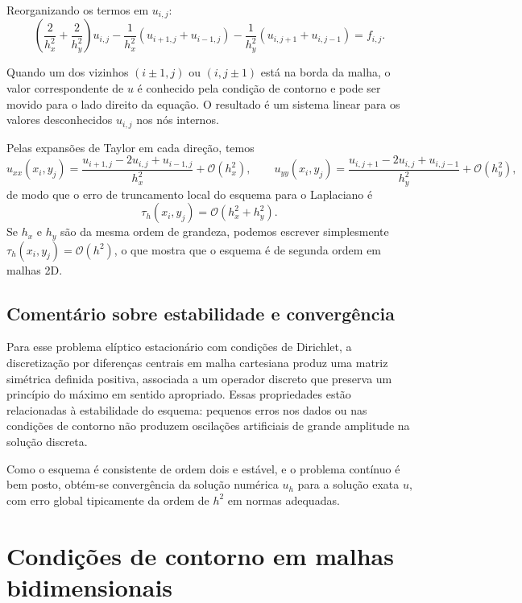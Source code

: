 Reorganizando os termos em $u_{i,j}$:
\begin{equation}
    \left(
      \frac{2}{h_x^2} + \frac{2}{h_y^2}
    \right) u_{i,j}
    - \frac{1}{h_x^2}\left(u_{i+1,j} + u_{i-1,j}\right)
    - \frac{1}{h_y^2}\left(u_{i,j+1} + u_{i,j-1}\right)
    = f_{i,j}.
\end{equation}

Quando um dos vizinhos $(i\pm1,j)$ ou $(i,j\pm1)$ está na borda da malha, 
o valor correspondente de $u$ é conhecido pela condição de contorno e pode 
ser movido para o lado direito da equação. O resultado é um sistema linear 
para os valores desconhecidos $u_{i,j}$ nos nós internos.

Pelas expansões de Taylor em cada direção, temos
\begin{equation}
    u_{xx}(x_i,y_j) 
      = \frac{u_{i+1,j} - 2u_{i,j} + u_{i-1,j}}{h_x^2}
        + \mathcal{O}(h_x^2),
    \qquad
    u_{yy}(x_i,y_j) 
      = \frac{u_{i,j+1} - 2u_{i,j} + u_{i,j-1}}{h_y^2}
        + \mathcal{O}(h_y^2),
\end{equation}
de modo que o erro de truncamento local do esquema para o Laplaciano é
\begin{equation}
    \tau_h(x_i,y_j) = \mathcal{O}(h_x^2 + h_y^2).
\end{equation}
Se $h_x$ e $h_y$ são da mesma ordem de grandeza, podemos escrever 
simplesmente $\tau_h(x_i,y_j) = \mathcal{O}(h^2)$, o que mostra que o 
esquema é de segunda ordem em malhas 2D.

\subsection{Comentário sobre estabilidade e convergência}

Para esse problema elíptico estacionário com condições de Dirichlet, a 
discretização por diferenças centrais em malha cartesiana produz uma matriz 
simétrica definida positiva, associada a um operador discreto que preserva 
um princípio do máximo em sentido apropriado. Essas propriedades estão 
relacionadas à estabilidade do esquema: pequenos erros nos dados ou nas 
condições de contorno não produzem oscilações artificiais de grande 
amplitude na solução discreta.

Como o esquema é consistente de ordem dois e estável, e o problema contínuo 
é bem posto, obtém-se convergência da solução numérica $u_h$ para a solução 
exata $u$, com erro global tipicamente da ordem de $h^2$ em normas adequadas.


\section{Condições de contorno em malhas bidimensionais}

